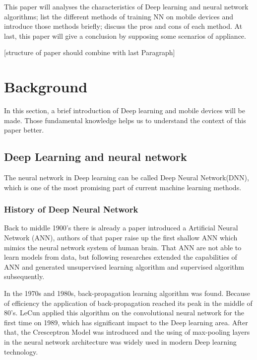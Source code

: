 \documentclass[article]{aaltoseries}
\begin{document}
This paper will analyses the characteristics of Deep learning and neural network algorithms;
list the different methods of training NN on mobile devices and introduce those methods briefly; 
discuss the pros and cons of each method.
At last, this paper will give a conclusion by supposing some scenarios of appliance.


[structure of paper should combine with last Paragraph]









\section{Background}

In this section, a brief introduction of Deep learning and mobile devices will be made. Those fundamental 
knowledge helps us to understand the context of this paper better.




\subsection{Deep Learning and neural network}

The neural network in Deep learning can be called Deep Neural Network(DNN), which is one of the most promising 
part of current machine learning methods. 

\subsubsection{History of Deep Neural Network}

Back to middle 1900's there is already a paper introduced a Artificial Neural Network (ANN)\cite{Warren1943}, authors
of that paper raise up the first shallow ANN which mimics the neural network system of human brain. That ANN are not
able to learn models from data, but following researches extended the capabilities of ANN and generated unsupervised 
learning algorithm and supervised algorithm subsequently.

In the 1970s and 1980s, back-propagation learning algorithm was found. Because of efficiency the application of back-propagation
reached its peak in the middle of 80's. LeCun applied this algorithm on the convolutional neural network 
for the first time on 1989, which has significant impact to the Deep learning area. After that, the Cresceptron Model was introduced
and the using of max-pooling layers in the neural network architecture was widely used in modern Deep learning technology.
\end{document}
